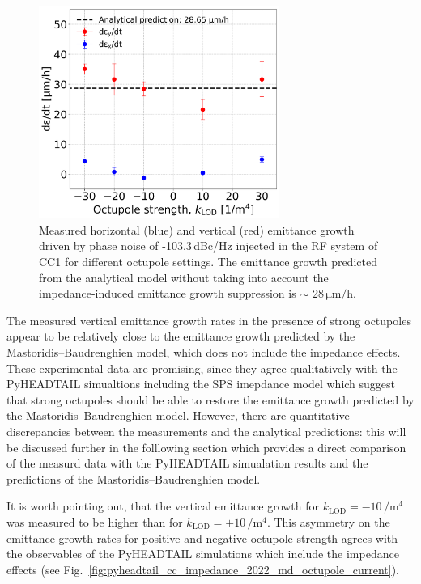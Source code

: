 \begin{figure}[!h]
   \centering         
   \includegraphics[width=0.7\textwidth]{images/Ch8/emit_H_and_V_octupole_scan_background_growth_subtracted_exp3_sep22.png}
       \caption{Measured horizontal (blue) and vertical (red) emittance growth driven by phase noise of -103.3\,dBc/Hz injected in the RF system of CC1 for different octupole settings. The emittance growth predicted from the analytical model without taking into account the impedance-induced emittance growth suppression is $\sim$ 28\,$\mathrm{\mu m/h}$.}
       \label{fig:H_V_emit_growth_background_subtracted_octupole_scan_sep22}
\end{figure}

The measured vertical emittance growth rates in the presence of strong octupoles appear to be relatively close to the emittance growth predicted by the Mastoridis--Baudrenghien model, which does not include the impedance effects. These experimental data are promising, since they agree qualitatively with the PyHEADTAIL simualtions including the SPS imepdance model which suggest that strong octupoles should be able to restore the emittance growth predicted by the Mastoridis--Baudrenghien model. However, there are quantitative discrepancies between the measurements and the analytical predictions: this will be discussed further in the folllowing section which provides a direct comparison of the measurd data with the PyHEADTAIL simualation results and the predictions of the Mastoridis--Baudrenghien model.

It is worth pointing out, that the vertical emittance growth for $k_\mathrm{LOD}=-10$\,$\mathrm{/m^4}$ was measured to be higher than for $k_\mathrm{LOD}=+10$\,$\mathrm{/m^4}$. This asymmetry on the emittance growth rates for positive and negative octupole strength agrees with the observables of the PyHEADTAIL simulations which include the impedance effects (see Fig.~\ref{fig:pyheadtail_cc_impedance_2022_md_octupole_current}).

